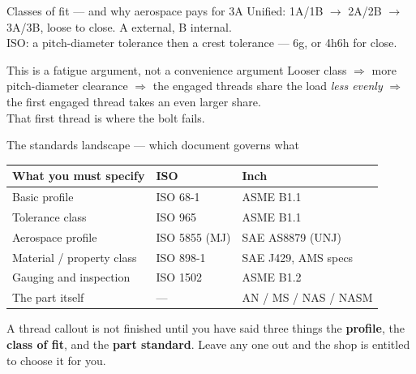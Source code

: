 \documentclass[aspectratio=169,10pt]{beamer}
\begin{document}
\begin{frame}{Classes of fit --- and why aerospace pays for 3A}
Unified: 1A/1B $\rightarrow$ 2A/2B $\rightarrow$ 3A/3B, loose to close. A external, B internal.\\[6pt]
ISO: a pitch-diameter tolerance then a crest tolerance --- 6g, or 4h6h for close.
\vfill
\begin{alertblock}{This is a fatigue argument, not a convenience argument}
Looser class $\Rightarrow$ more pitch-diameter clearance $\Rightarrow$ the engaged threads share the
load \emph{less evenly} $\Rightarrow$ the first engaged thread takes an even larger share.\\[5pt]
That first thread is where the bolt fails.
\end{alertblock}
\end{frame}

\begin{frame}{The standards landscape --- which document governs what}
\centering\small
\begin{tabular}{@{}lll@{}}
\toprule
\textbf{What you must specify} & \textbf{ISO} & \textbf{Inch}\\
\midrule
Basic profile & ISO 68-1 & ASME B1.1\\
Tolerance class & ISO 965 & ASME B1.1\\
\alert{Aerospace profile} & \alert{ISO 5855 (MJ)} & \alert{SAE AS8879 (UNJ)}\\
Material / property class & ISO 898-1 & SAE J429, AMS specs\\
Gauging and inspection & ISO 1502 & ASME B1.2\\
The part itself & --- & AN / MS / NAS / NASM\\
\bottomrule
\end{tabular}
\vfill
\raggedright
\begin{alertblock}{A thread callout is not finished until you have said three things}
the \textbf{profile}, the \textbf{class of fit}, and the \textbf{part standard}. Leave any one out and
the shop is entitled to choose it for you.
\end{alertblock}
\end{frame}
\end{document}
